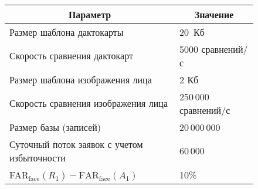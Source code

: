 \begin{figure} %
     \vspace*{1pt}
\begin{center}
\mbox{%
\epsfxsize=144.976mm
}
\end{center}
\vspace*{-9pt}
 \vspace*{6pt}  
 \renewcommand{\figurename}{\protect\bf Таблица}
 \setcounter{figure}{1}
     \begin{center}
     \vspace*{2ex}
     
     {\small
     \begin{tabular}{|l|l|}
     \hline
\multicolumn{1}{|c|}{Параметр}&\multicolumn{1}{c|}{Значение}\\
\hline
Размер шаблона дактокарты&20~Кб\\
Скорость сравнения дактокарт&5000 сравнений/с\\
Размер шаблона изображения лица&2 Кб\\
Скорость сравнения изображения лица &250\,000 сравнений/с\\
Размер базы (записей)&20\,000\,000\\
Суточный поток заявок с учетом избыточности&60\,000 \\
FAR$_{\mathrm{face}} (R_1)-\mathrm{FAR}_{\mathrm{face}}(A_1)$ &10\%\\
\hline
\end{tabular}}
\end{center}
\vspace*{3pt}
\end{figure}

\renewcommand{\figurename}{\protect\bf Рис.}

